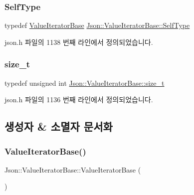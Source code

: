 \subsubsection{\texorpdfstring{Self\+Type}{SelfType}}
{\footnotesize\ttfamily typedef \hyperlink{class_json_1_1_value_iterator_base}{Value\+Iterator\+Base} \hyperlink{class_json_1_1_value_iterator_base_a9d2a940d03ea06d20d972f41a89149ee}{Json\+::\+Value\+Iterator\+Base\+::\+Self\+Type}}



json.\+h 파일의 1138 번째 라인에서 정의되었습니다.

\mbox{\label{class_json_1_1_value_iterator_base_a9d3a3c7ce5cdefe23cb486239cf07bb5}} 
\subsubsection{\texorpdfstring{size\+\_\+t}{size\_t}}
{\footnotesize\ttfamily typedef unsigned int \hyperlink{class_json_1_1_value_iterator_base_a9d3a3c7ce5cdefe23cb486239cf07bb5}{Json\+::\+Value\+Iterator\+Base\+::size\+\_\+t}}



json.\+h 파일의 1136 번째 라인에서 정의되었습니다.



\subsection{생성자 \& 소멸자 문서화}
\mbox{\label{class_json_1_1_value_iterator_base_af45b028d9ff9cbd2554a87878b42dd75}} 
\subsubsection{\texorpdfstring{Value\+Iterator\+Base()}{ValueIteratorBase()}\hspace{0.1cm}{\footnotesize\ttfamily [1/2]}}
{\footnotesize\ttfamily Json\+::\+Value\+Iterator\+Base\+::\+Value\+Iterator\+Base (\begin{DoxyParamCaption}{ }\end{DoxyParamCaption})}



